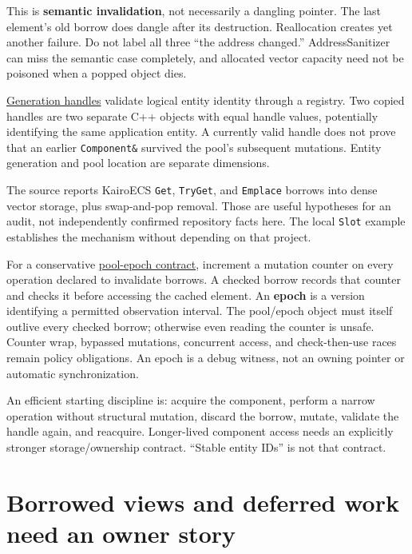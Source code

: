This is \textbf{semantic invalidation}, not necessarily a dangling pointer. The last element's old borrow does dangle after its destruction. Reallocation creates yet another failure. Do not label all three ``the address changed.'' AddressSanitizer can miss the semantic case completely, and allocated vector capacity need not be poisoned when a popped object dies.

\hyperref[appendix-f1581457d322]{Generation handles} validate logical entity identity through a registry. Two copied handles are two separate C++ objects with equal handle values, potentially identifying the same application entity. A currently valid handle does not prove that an earlier \texttt{Component\&} survived the pool's subsequent mutations. Entity generation and pool location are separate dimensions.

The source reports KairoECS \texttt{Get}, \texttt{TryGet}, and \texttt{Emplace} borrows into dense vector storage, plus swap-and-pop removal. Those are useful hypotheses for an audit, not independently confirmed repository facts here. The local \texttt{Slot} example establishes the mechanism without depending on that project.

For a conservative \hyperref[appendix-aa405b7c3903]{pool-epoch contract}, increment a mutation counter on every operation declared to invalidate borrows. A checked borrow records that counter and checks it before accessing the cached element. An \textbf{epoch} is a version identifying a permitted observation interval. The pool/epoch object must itself outlive every checked borrow; otherwise even reading the counter is unsafe. Counter wrap, bypassed mutations, concurrent access, and check-then-use races remain policy obligations. An epoch is a debug witness, not an owning pointer or automatic synchronization.

An efficient starting discipline is: acquire the component, perform a narrow operation without structural mutation, discard the borrow, mutate, validate the handle again, and reacquire. Longer-lived component access needs an explicitly stronger storage/ownership contract. ``Stable entity IDs'' is not that contract.

\section{Borrowed views and deferred work need an owner story}\label{01-foundations-i-ch003-borrowed-views-and-deferred-work-need-an-owner-story}

\hypertarget{01-foundations-i-ch003-borrowed-views-and-deferred-work-need-an-owner-story}{}

